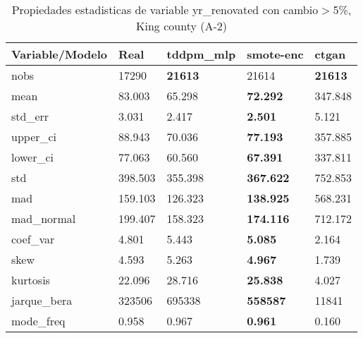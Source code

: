 \begin{table}[H]
\centering
\fontsize{8}{14}\selectfont
\caption{Propiedades estadisticas de variable yr\_renovated con cambio\ensuremath{>}5\%, King county (A-2)}
\label{table-stats-king county-a-2-yr_renovated-short}
\begin{tabular}{|l|m{10em}|m{10em}|m{10em}|m{10em}|}
\hline
 \rowcolor[gray]{0.8}
Variable/Modelo & Real & tddpm\_mlp & smote-enc & ctgan \\
\hline nobs & 17290 & \bfseries 21613 & \cellcolor[rgb]{0.9, 0.54, 0.52} 21614 & \bfseries 21613 \\
\hline mean & 83.003 & 65.298 & \bfseries 72.292 & \cellcolor[rgb]{0.9, 0.54, 0.52} 347.848 \\
\hline std\_err & 3.031 & 2.417 & \bfseries 2.501 & \cellcolor[rgb]{0.9, 0.54, 0.52} 5.121 \\
\hline upper\_ci & 88.943 & 70.036 & \bfseries 77.193 & \cellcolor[rgb]{0.9, 0.54, 0.52} 357.885 \\
\hline lower\_ci & 77.063 & 60.560 & \bfseries 67.391 & \cellcolor[rgb]{0.9, 0.54, 0.52} 337.811 \\
\hline std & 398.503 & 355.398 & \bfseries 367.622 & \cellcolor[rgb]{0.9, 0.54, 0.52} 752.853 \\
\hline mad & 159.103 & 126.323 & \bfseries 138.925 & \cellcolor[rgb]{0.9, 0.54, 0.52} 568.231 \\
\hline mad\_normal & 199.407 & 158.323 & \bfseries 174.116 & \cellcolor[rgb]{0.9, 0.54, 0.52} 712.172 \\
\hline coef\_var & 4.801 & 5.443 & \bfseries 5.085 & \cellcolor[rgb]{0.9, 0.54, 0.52} 2.164 \\
\hline skew & 4.593 & 5.263 & \bfseries 4.967 & \cellcolor[rgb]{0.9, 0.54, 0.52} 1.739 \\
\hline kurtosis & 22.096 & 28.716 & \bfseries 25.838 & \cellcolor[rgb]{0.9, 0.54, 0.52} 4.027 \\
\hline jarque\_bera & 323506 & \cellcolor[rgb]{0.9, 0.54, 0.52} 695338 & \bfseries 558587 & 11841 \\
\hline mode\_freq & 0.958 & 0.967 & \bfseries 0.961 & \cellcolor[rgb]{0.9, 0.54, 0.52} 0.160 \\
\hline
\end{tabular}
\end{table}
